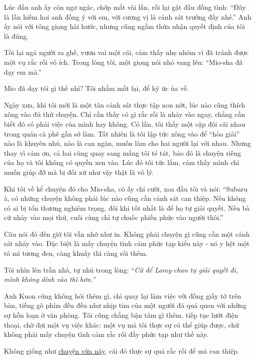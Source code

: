 \documentclass[../main.tex]{subfiles}
\begin{document}
Lúc đầu anh ấy còn ngơ ngác, chớp mắt vài lần, rồi lại gật đầu đồng tình: ``Đây là lần hiếm hoi anh đồng ý với em, với cương vị là cảnh sát trưởng đấy nhé.'' Anh ấy nói với tông giọng hài hước, nhưng cũng ngầm thừa nhận quyết định của tôi là đúng.

Tôi lại ngả người ra ghế, vươn vai một cái, cảm thấy nhẹ nhõm vì đã tránh được một vụ rắc rối vô ích. Trong lòng tôi, một giọng nói nhỏ vang lên: ``Mio-sha đã dạy em mà.''

Mio đã dạy tôi gì thế nhỉ? Tôi nhắm mắt lại, để ký ức ùa về.

Ngày xưa, khi tôi mới là một tân cảnh sát thực tập non nớt, lúc nào cũng thích xông vào đủ thứ chuyện. Chỉ cần thấy có gì rắc rối là nhảy vào ngay, chẳng cần biết đó có phải việc của mình hay không. Có lần, tôi thấy một cặp đôi cãi nhau trong quán cà phê gần sở làm. Tất nhiên là tôi lập tức xông vào để ``hòa giải'' nào là khuyên nhủ, nào là can ngăn, muốn làm cho hai người lại với nhau. Nhưng thay vì cảm ơn, cả hai cùng quay sang mắng tôi té tát, bảo đó là chuyện riêng của họ và tôi không có quyền xen vào. Lúc đó tôi tức lắm, cảm thấy mình chỉ muốn giúp đỡ mà bị đối xử như vậy thật là vô lý.

Khi tôi về kể chuyện đó cho Mio-sha, cô ấy chỉ cười, xoa đầu tôi và nói: ``Subaru à, có những chuyện không phải lúc nào cũng cần cảnh sát can thiệp. Nếu không có ai bị tổn thương nghiêm trọng, đôi khi tốt nhất là để họ tự giải quyết. Nếu bà cứ nhảy vào mọi thứ, cuối cùng chỉ tự chuốc phiền phức vào người thôi.''

Câu nói đó đến giờ tôi vẫn nhớ như in. Không phải chuyện gì cũng cần một cảnh sát nhảy vào. Đặc biệt là mấy chuyện tình cảm phức tạp kiểu này - nó y hệt một tô mì tương đen, càng khuấy thì càng rối thêm.

Tôi nhìn lên trần nhà, tự nhủ trong lòng: ``\textit{Cứ để Lamy-chan tự giải quyết đi, mình không dính vào thì hơn.}''

Anh Kuon cũng không hỏi thêm gì, chỉ quay lại làm việc với đống giấy tờ trên bàn, tiếng gõ phím đều đều như nhịp tim của một người đã quá quen với những sự hỗn loạn ở văn phòng. Tôi cũng chẳng bận tâm gì thêm, tiếp tục lướt điện thoại, chờ đợi một vụ việc khác: một vụ mà tôi thực sự có thể giúp được, chứ không phải mấy chuyện tình cảm rắc rối đầy phức tạp như thế này.

Không giống như \uline{chuyện vừa nãy}, cái đó thực sự quá rắc rối để mà can thiệp.

\ct

\pov{-}
\end{document}
